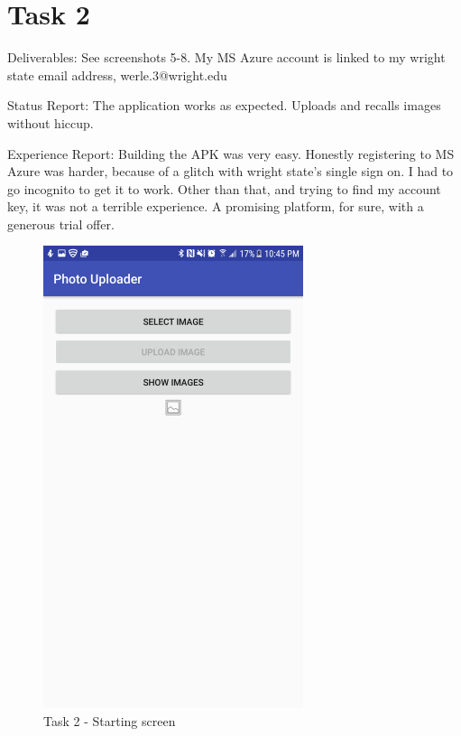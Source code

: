 \documentclass{article}
\begin{document}
\clearpage
\section{Task 2}
Deliverables: See screenshots 5-8. My MS Azure account is linked to my wright state email address, werle.3@wright.edu

Status Report: The application works as expected. Uploads and recalls images without hiccup.

Experience Report: Building the APK was very easy. Honestly registering to MS Azure was harder, because of a glitch with wright state's single sign on. I had to go incognito to get it to work. Other than that, and trying to find my account key, it was not a terrible experience. A promising platform, for sure, with a generous trial offer.

	\begin{figure}[ht]
		\includegraphics[width=3in]{img/t2s1.png}
		\centering
		\caption{Task 2 - Starting screen}
	\end{figure}
\end{document}

